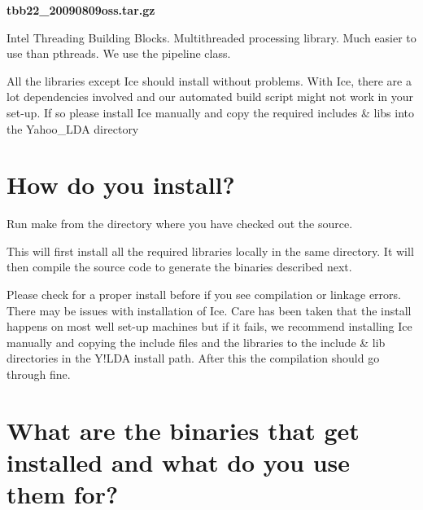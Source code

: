 \begin{DoxyEnumerate}
{\bfseries tbb22\_\-20090809oss.tar.gz }\par
 Intel Threading Building Blocks. Multithreaded processing library. Much easier to use than pthreads. We use the pipeline class. 
\end{DoxyEnumerate}All the libraries except Ice should install without problems. With Ice, there are a lot dependencies involved and our automated build script might not work in your set-\/up. If so please install Ice manually and copy the required includes \& libs into the Yahoo\_\-LDA directory \section*{How do you install?}


\begin{DoxyEnumerate}
\item 

Run make from the directory where you have checked out the source. 
\item 

This will first install all the required libraries locally in the same directory. It will then compile the source code to generate the binaries described next. 
\item 

Please check for a proper install before if you see compilation or linkage errors. There may be issues with installation of Ice. Care has been taken that the install happens on most well set-\/up machines but if it fails, we recommend installing Ice manually and copying the include files and the libraries to the include \& lib directories in the Y!LDA install path. After this the compilation should go through fine. 
\end{DoxyEnumerate}

\par
  \section*{What are the binaries that get installed and what do you use them for?}


